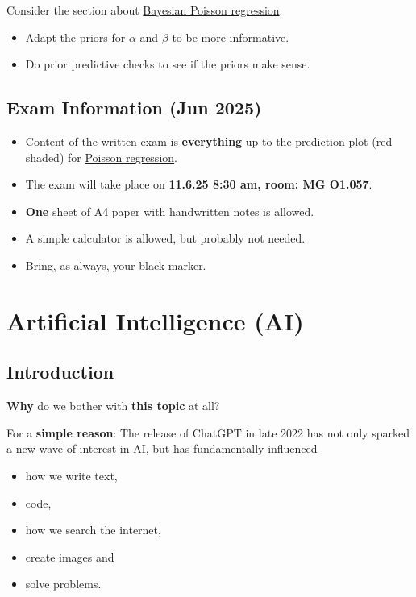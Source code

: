 \documentclass[
]{book}
\providecommand{\tightlist}{%
  \setlength{\itemsep}{0pt}\setlength{\parskip}{0pt}}
\begin{document}
Consider the section about \hyperref[bayesian_poisson_regression]{Bayesian Poisson regression}.

\begin{itemize}
\tightlist
\item
  Adapt the priors for \(\alpha\) and \(\beta\) to be more informative.
\item
  Do prior predictive checks to see if the priors make sense.
\end{itemize}

\section{Exam Information (Jun 2025)}\label{exam-information-jun-2025}

\begin{itemize}
\tightlist
\item
  Content of the written exam is \textbf{everything} up to the prediction
  plot (red shaded) for \href{https://jdegenfellner.github.io/Script_QM3_ZHAW/further-regression-methods.html\#poisson-regression}{Poisson regression}.
\item
  The exam will take place on \textbf{11.6.25 8:30 am, room: MG O1.057}.
\item
  \textbf{One} sheet of A4 paper with handwritten notes is allowed.
\item
  A simple calculator is allowed, but probably not needed.
\item
  Bring, as always, your black marker.
\end{itemize}

\chapter{Artificial Intelligence (AI)}\label{artificial-intelligence-ai}

\section{Introduction}\label{introduction}

\textbf{Why} do we bother with \textbf{this topic} at all?

For a \textbf{simple reason}: The release of ChatGPT in late 2022
has not only sparked a new wave of interest in AI,
but has fundamentally influenced

\begin{itemize}
\tightlist
\item
  how we write text,
\item
  code,
\item
  how we search the internet,
\item
  create images and
\item
  solve problems.
\end{itemize}
\end{document}
